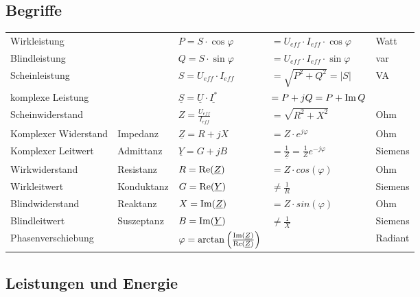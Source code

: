 	\subsection{Begriffe}
		\begin{tabular}{lllll}
		Wirkleistung & & $P = S \cdot \cos \varphi$ & $= U_{eff} \cdot I_{eff} \cdot
		\cos \varphi$ & Watt\\
		Blindleistung & & $Q = S \cdot \sin \varphi$ & $=U_{eff} \cdot I_{eff} \cdot
		\sin \varphi$ & var \\
		Scheinleistung & & $S = U_{eff} \cdot I_{eff}$  &
		$=\sqrt{P^2+Q^2}=\left|S\right|$ & VA\\
		komplexe Leistung & & $\underline{S}=\underline{U}\cdot\underline{I^*}$ &
		$=P+jQ=P+\operatorname{Im}{Q}$\\
		Scheinwiderstand & & $Z = \frac{U_{eff}}{I_{eff}} $ & $ =
		\sqrt{R^2+X^2}$ & Ohm\\ Komplexer Widerstand & Impedanz & $\underline Z = R + jX $ & $ = Z \cdot
		e^{j \varphi}$ & Ohm\\
		Komplexer Leitwert & Admittanz & $\underline Y = G + jB $ & $ =
		\frac{1}{\underline Z} = \frac{1}{Z}e^{-j\varphi}$ & Siemens\\
		Wirkwiderstand & Resistanz & $R = \operatorname{Re}(\underline Z) $ & $ = Z
		\cdot cos(\varphi)$ & Ohm\\
		Wirkleitwert & Konduktanz & $G = \operatorname{Re}(\underline Y) $ & $ \neq \frac{1}{R}$ &
		Siemens\\
		Blindwiderstand & Reaktanz & $X = \operatorname{Im}(\underline Z) $ & $ = Z
		\cdot sin(\varphi)$ & Ohm\\
		Blindleitwert & Suszeptanz & $B = \operatorname{Im}( \underline Y) $ & $ \neq \frac{1}{X}$
		& Siemens\\
		Phasenverschiebung & & $\varphi =
		\arctan\left(\frac{\operatorname{Im}(\underline{Z})}{\operatorname{Re}(\underline{Z})}\right)$ & &
		Radiant\\
		
		\end{tabular}
	
	
	
	
	
	\subsection{Leistungen und Energie}
